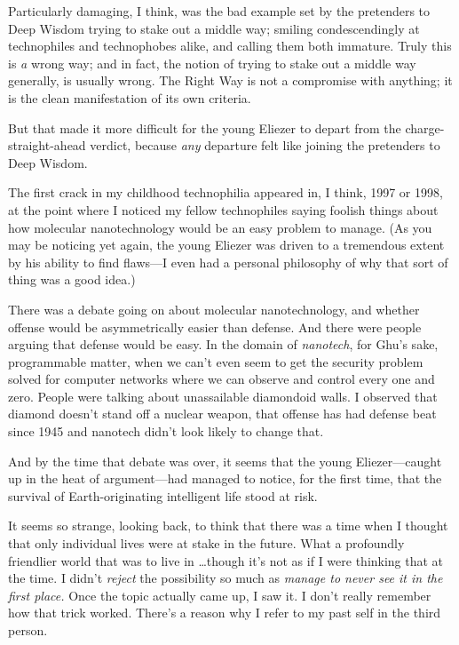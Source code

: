 {
 Particularly damaging, I think, was the bad example set by the
pretenders to Deep Wisdom trying to stake out a middle way; smiling
condescendingly at technophiles and technophobes alike, and calling
them both immature. Truly this is \textit{a} wrong way; and in fact,
the notion of trying to stake out a middle way generally, is usually
wrong. The Right Way is not a compromise with anything; it is the clean
manifestation of its own criteria.}

{
 But that made it more difficult for the young Eliezer to depart
from the charge-straight-ahead verdict, because \textit{any} departure
felt like joining the pretenders to Deep Wisdom.}

{
 The first crack in my childhood technophilia appeared in, I think,
1997 or 1998, at the point where I noticed my fellow technophiles
saying foolish things about how molecular nanotechnology would be an
easy problem to manage. (As you may be noticing yet again, the young
Eliezer was driven to a tremendous extent by his ability to find
flaws---I even had a personal philosophy of why that sort of thing was
a good idea.)}

{
 There was a debate going on about molecular nanotechnology, and
whether offense would be asymmetrically easier than defense. And there
were people arguing that defense would be easy. In the domain of
\textit{nanotech}, for Ghu's sake, programmable matter,
when we can't even seem to get the security problem
solved for computer networks where we can observe and control every one
and zero. People were talking about unassailable diamondoid walls. I
observed that diamond doesn't stand off a nuclear
weapon, that offense has had defense beat since 1945 and nanotech
didn't look likely to change that.}

{
 And by the time that debate was over, it seems that the young
Eliezer---caught up in the heat of argument---had managed to notice,
for the first time, that the survival of Earth-originating intelligent
life stood at risk.}

{
 It seems so strange, looking back, to think that there was a time
when I thought that only individual lives were at stake in the future.
What a profoundly friendlier world that was to live in \ldots though
it's not as if I were thinking that at the time. I
didn't \textit{reject} the possibility so much as
\textit{manage to never see it in the first place.} Once the topic
actually came up, I saw it. I don't really remember how
that trick worked. There's a reason why I refer to my
past self in the third person.}

